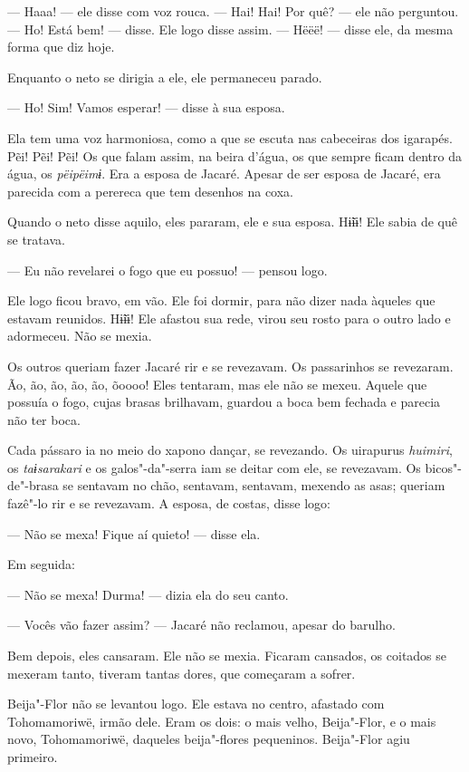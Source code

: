 --- Haaa! --- ele disse com voz rouca. --- Hai! Hai! Por quê? --- ele não perguntou. --- Ho! Está bem! --- disse. Ele logo disse assim. --- Hëëë! --- disse ele, da mesma forma que diz hoje. 

Enquanto o neto se dirigia a ele, ele permaneceu parado. 

--- Ho! Sim! Vamos esperar! --- disse à sua esposa. 

Ela tem uma voz harmoniosa, como a que se escuta nas cabeceiras dos
igarapés. Pẽi! Pẽi! Pẽi! Os que falam assim, na beira d'água, os
que sempre ficam dentro da água, os \emph{pëipëimɨ}. Era a esposa de
Jacaré. Apesar de ser esposa de Jacaré, era parecida com a perereca que
tem desenhos na coxa. 

Quando o neto disse aquilo, eles pararam, ele e sua esposa. Hɨ̃ɨɨ!
Ele sabia de quê se tratava. 

--- Eu não revelarei o fogo que eu possuo! --- pensou logo. 

Ele logo ficou bravo, em vão. Ele foi dormir, para não dizer nada
àqueles que estavam reunidos. Hɨ̃ɨɨ! Ele afastou sua rede, virou
seu rosto para o outro lado e adormeceu. Não se mexia. 

Os outros queriam fazer Jacaré rir e se revezavam. Os passarinhos se
revezaram. Ão, ão, ão, ão, ão, õoooo! Eles tentaram, mas ele não
se mexeu. Aquele que possuía o fogo, cujas brasas brilhavam, guardou a
boca bem fechada e parecia não ter boca. 

Cada pássaro ia no meio do xapono dançar, se revezando.
Os uirapurus \emph{huimiri}, os \emph{taɨsarakari} e os galos"-da"-serra iam se deitar
com ele, se revezavam. Os bicos"-de"-brasa se sentavam no chão, sentavam,
sentavam, mexendo as asas; queriam fazê"-lo rir e se revezavam. A esposa,
de costas, disse logo: 

--- Não se mexa! Fique aí quieto! --- disse ela.

Em seguida:

--- Não se mexa! Durma! --- dizia ela do seu canto.

--- Vocês vão fazer assim? --- Jacaré não reclamou, apesar do barulho. 

Bem depois, eles cansaram. Ele não se mexia. Ficaram cansados, os
coitados se mexeram tanto, tiveram tantas dores, que começaram a
sofrer. 

Beija"-Flor não se levantou logo. Ele estava no centro, afastado com
Tohomamoriwë, irmão dele. Eram os dois: o mais velho, Beija"-Flor, e o
mais novo, Tohomamoriwë, daqueles beija"-flores pequeninos. Beija"-Flor
agiu primeiro. 

